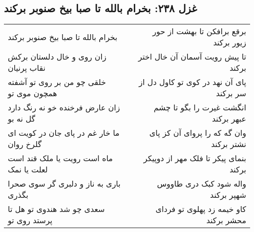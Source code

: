 \begin{center}
\section*{غزل ۲۳۸: بخرام بالله تا صبا بیخ صنوبر برکند}
\label{sec:238}
\begin{longtable}{l p{0.5cm} r}
بخرام بالله تا صبا بیخ صنوبر برکند
&&
برقع برافکن تا بهشت از حور زیور برکند
\\
زان روی و خال دلستان برکش نقاب پرنیان
&&
تا پیش رویت آسمان آن خال اختر برکند
\\
خلقی چو من بر روی تو آشفته همچون موی تو
&&
پای آن نهد در کوی تو کاول دل از سر برکند
\\
زان عارض فرخنده خو نه رنگ دارد گل نه بو
&&
انگشت غیرت را بگو تا چشم عبهر برکند
\\
ما خار غم در پای جان در کویت ای گلرخ روان
&&
وان گه که را پروای آن کز پای نشتر برکند
\\
ماه است رویت یا ملک قند است لعلت یا نمک
&&
بنمای پیکر تا فلک مهر از دوپیکر برکند
\\
باری به ناز و دلبری گر سوی صحرا بگذری
&&
واله شود کبک دری طاووس شهپر برکند
\\
سعدی چو شد هندوی تو هل تا پرستد روی تو
&&
کاو خیمه زد پهلوی تو فردای محشر برکند
\\
\end{longtable}
\end{center}
